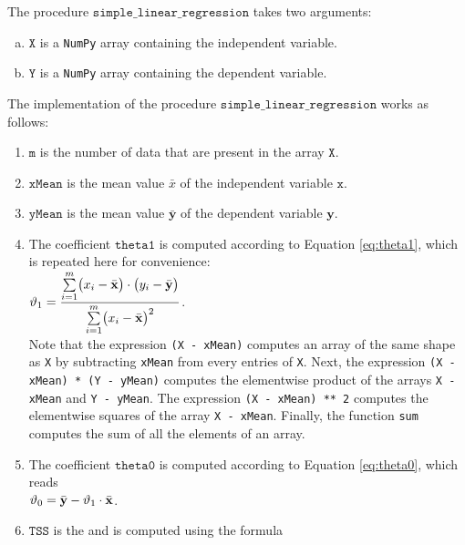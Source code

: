 \noindent
The procedure $\mathtt{simple\_linear\_regression}$ takes two arguments:
\begin{enumerate}[(a)]
\item $\mathtt{X}$ is a \texttt{NumPy} array containing the independent variable.
\item $\mathtt{Y}$ is a \texttt{NumPy} array containing the dependent variable.
\end{enumerate}
The implementation of the procedure $\mathtt{simple\_linear\_regression}$ works as follows:
\begin{enumerate}
\item $\mathtt{m}$ is the number of data that are present in the array $\texttt{X}.$
\item $\mathtt{xMean}$ is the mean value $\bar{x}$ of the independent variable $\mathtt{x}$.
\item $\mathtt{yMean}$ is the mean value $\bar{\mathbf{y}}$ of the dependent variable $\mathbf{y}$. 
\item The coefficient $\mathtt{theta1}$ is computed according to Equation \ref{eq:theta1}, which is repeated
      here for convenience:
      \\[0.2cm]
      \hspace*{1.3cm}
      $\displaystyle\vartheta_1 = \frac{\sum\limits_{i=1}^m \bigl(x_i - \bar{\mathbf{x}}\bigr) \cdot \bigl(y_i - \bar{\mathbf{y}}\bigr)}{
                        \sum\limits_{i=1}^m \bigl(x_i - \bar{\mathbf{x}}\bigr)^2}  
      $.
      \\[0.2cm]
      Note that the expression \texttt{(X - xMean)} computes an array of the same shape as \texttt{X}
      by subtracting \texttt{xMean} from every entries of \texttt{X}.
      Next, the expression \texttt{(X - xMean) * (Y - yMean)} computes the elementwise product
      of the arrays \texttt{X - xMean} and \texttt{Y - yMean}.
      The expression \texttt{(X - xMean) ** 2} computes the elementwise squares of the array \texttt{X - xMean}.
      Finally, the function \texttt{sum} computes the sum of all the elements of an array.
\item The coefficient $\mathtt{theta0}$ is computed according to Equation \ref{eq:theta0}, which reads
      \\[0.2cm]
      \hspace*{1.3cm}
      $\displaystyle\vartheta_0 = \bar{\mathbf{y}} - \vartheta_1 \cdot \bar{\mathbf{x}}$.
\item $\mathtt{TSS}$ is the  and is computed using the formula
      \\[0.2cm]

\end{enumerate}
